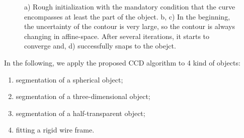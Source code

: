 \begin{figure}[htbp]
  \begin{minipage}[t]{0.5\linewidth} 
    \centering 
  \end{minipage} 
\caption[Segmentation of a ball] {a) Rough initialization with the
  mandatory condition that the curve encompasses at least the part of
  the object. b, c) In the beginning, the uncertainty of
  the contour is very large, so the contour is always changing in
  affine-space. After several iterations, it starts to converge and, 
  d) successfully snaps to the obejct.
\label{fig:sab}
}
\end{figure}

In the following, we apply the proposed CCD algorithm to 4 kind of
objects:
\begin{enumerate}
\item segmentation of a spherical object;
\item segmentation of a three-dimensional object;
\item segmentation of a half-transparent object;
\item fitting a rigid wire frame.
\end{enumerate}

